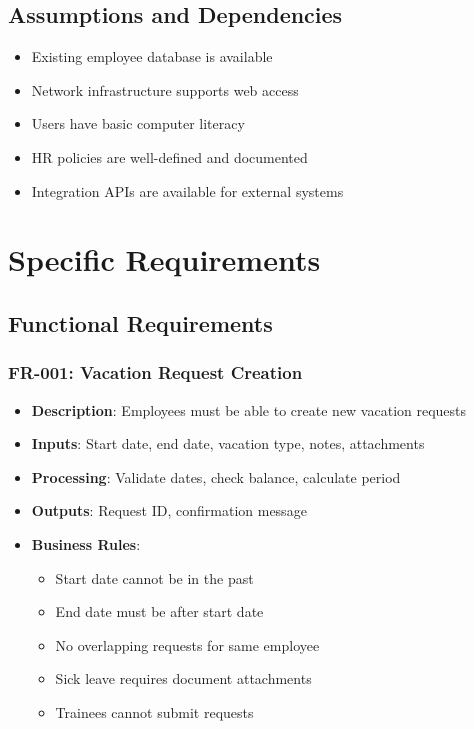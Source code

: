 \documentclass[12pt,a4paper]{article}
\begin{document}
\subsection{Assumptions and Dependencies}
\begin{itemize}
    \item Existing employee database is available
    \item Network infrastructure supports web access
    \item Users have basic computer literacy
    \item HR policies are well-defined and documented
    \item Integration APIs are available for external systems
\end{itemize}

\section{Specific Requirements}

\subsection{Functional Requirements}

\subsubsection{FR-001: Vacation Request Creation}
\begin{itemize}
    \item \textbf{Description}: Employees must be able to create new vacation requests
    \item \textbf{Inputs}: Start date, end date, vacation type, notes, attachments
    \item \textbf{Processing}: Validate dates, check balance, calculate period
    \item \textbf{Outputs}: Request ID, confirmation message
    \item \textbf{Business Rules}:
    \begin{itemize}
        \item Start date cannot be in the past
        \item End date must be after start date
        \item No overlapping requests for same employee
        \item Sick leave requires document attachments
        \item Trainees cannot submit requests
    \end{itemize}
\end{itemize}
\end{document}
